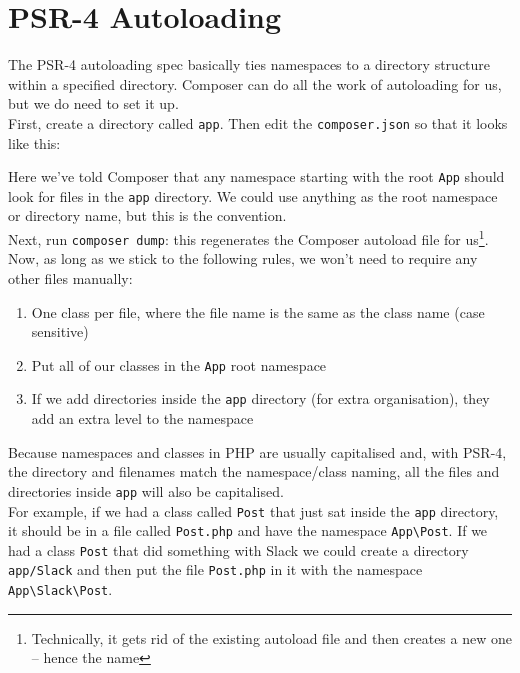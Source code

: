 \section{PSR-4 Autoloading}

The PSR-4 autoloading spec basically ties namespaces to a directory structure within a specified directory. Composer can do all the work of autoloading for us, but we do need to set it up.
\\

First, create a directory called \texttt{app}. Then edit the \texttt{composer.json} so that it looks like this:


Here we've told Composer that any namespace starting with the root \texttt{App} should look for files in the \texttt{app} directory. We could use anything as the root namespace or directory name, but this is the convention.
\\

Next, run \texttt{composer dump}: this regenerates the Composer autoload file for us\footnote{Technically, it gets rid of the existing autoload file and then creates a new one – hence the name}.
\\

Now, as long as we stick to the following rules, we won't need to require any other files manually:

\begin{enumerate}
    \item One class per file, where the file name is the same as the class name (case sensitive)
    \item Put all of our classes in the \texttt{App} root namespace
    \item If we add directories inside the \texttt{app} directory (for extra organisation), they add an extra level to the namespace
\end{enumerate}

Because namespaces and classes in PHP are usually capitalised and, with PSR-4, the directory and filenames match the namespace/class naming, all the files and directories inside \texttt{app} will also be capitalised.
\\

For example, if we had a class called \texttt{Post} that just sat inside the \texttt{app} directory, it should be in a file called \texttt{Post.php} and have the namespace \texttt{App\textbackslash Post}. If we had a class \texttt{Post} that did something with Slack we could create a directory \texttt{app/Slack} and then put the file \texttt{Post.php} in it with the namespace \texttt{App\textbackslash Slack\textbackslash Post}.
\\

